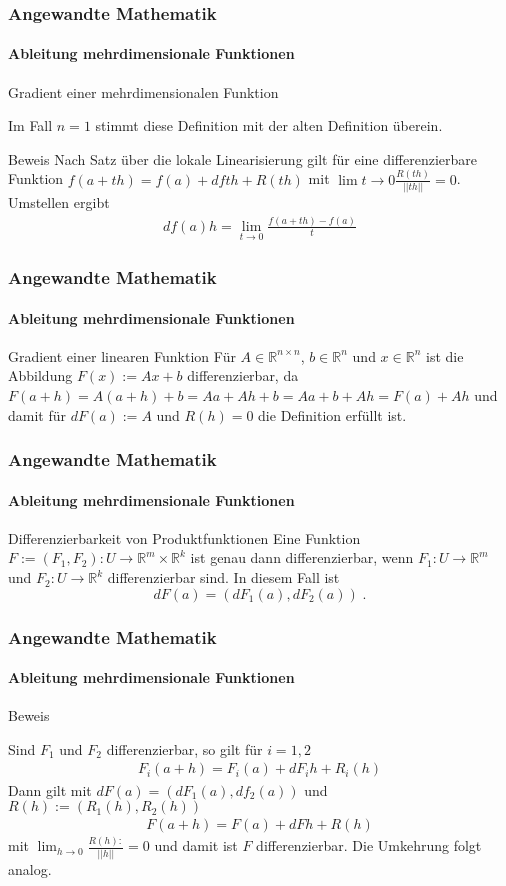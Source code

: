 \documentclass{beamer}
\begin{document}
\begin{frame}
    \frametitle{Angewandte Mathematik}
\framesubtitle{ Ableitung mehrdimensionale Funktionen}
    \begin{block}{Gradient einer  mehrdimensionalen Funktion}

Im Fall $n = 1$ stimmt diese Definition mit der alten Definition überein.

\end{block}
    \begin{block}{Beweis}
Nach Satz über die lokale Linearisierung gilt für eine differenzierbare Funktion $f(a + th) = f(a) + df th + R(th)$ mit  $\lim{t \to 0} \frac{R(th)}{||t h||} = 0$. Umstellen ergibt
\begin{align*}
df(a) h = \lim_{t \to 0} \frac{f(a + th) - f(a)}{t}
\end{align*} 
\end{block}
 \end{frame}

\begin{frame}
    \frametitle{Angewandte Mathematik}
\framesubtitle{Ableitung mehrdimensionale Funktionen}
    \begin{block}{Gradient einer linearen Funktion}
Für $A \in \mathbb{R}^{n \times n}$, $b \in \mathbb{R}^n$ und $x \in \mathbb{R}^n$ ist die Abbildung $F(x) := Ax +b$ differenzierbar, da
$F(a +h) = A(a+h) + b = A a+ Ah +b = Aa +b + Ah = F(a) + Ah$ und damit für $dF(a) := A$ und $R(h) = 0$ die Definition
 erfüllt ist.
\end{block}
 \end{frame}


\begin{frame}
    \frametitle{Angewandte Mathematik}
\framesubtitle{Ableitung mehrdimensionale Funktionen}
    \begin{block}{Differenzierbarkeit von Produktfunktionen}
Eine Funktion $F:= (F_1, F_2) : U  \to \mathbb{R}^m \times \mathbb{R}^k$ ist genau dann differenzierbar, 
wenn $F_1 : U  \to \mathbb{R}^m$ und   $F_2 : U  \to \mathbb{R}^k$ differenzierbar sind. In diesem Fall ist
$$dF(a) = (dF_1(a), dF_2 (a)) \;.$$ 
\end{block}
 \end{frame}



\begin{frame}
    \frametitle{Angewandte Mathematik}
\framesubtitle{Ableitung mehrdimensionale Funktionen}
    \begin{block}{Beweis}

Sind $F_1$ und $F_2$ differenzierbar, so gilt für $i = 1,2$
\begin{align*}
F_i (a + h) = F_i(a) + dF_ih + R_i(h)
\end{align*}
Dann gilt mit $dF(a) = (dF_1(a), df_2 (a))$ und $R(h):= (R_1(h), R_2(h))$
\begin{align*}
F (a + h) = F (a) + dF h + R(h)
\end{align*}
mit $\lim_{h \to 0} \frac{R(h):}{||h||} = 0$ und damit ist $F$ differenzierbar. Die Umkehrung folgt analog.
\end{block}
 \end{frame}
\end{document}
